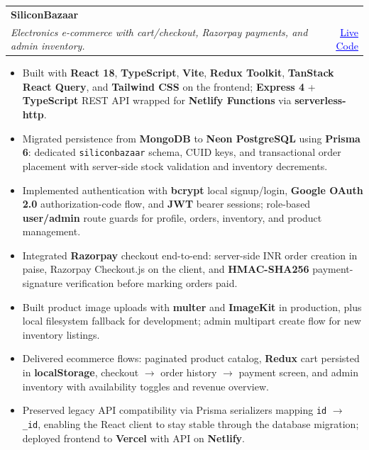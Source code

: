 \documentclass[a4paper,11pt]{article}
\makeatletter
\newcommand{\resumeProjectHeading}[4]{
\vspace{0.5mm}
    \item[]
    \begin{tabular*}{0.98\textwidth}[t]{l@{\extracolsep{\fill}}r}
        \textbf{#1} & \textit{\footnotesize{#2}} \\
        \textit{\footnotesize{#3}} & \footnotesize{#4}
    \end{tabular*}
    \vspace{-2.4mm}
}
\newcommand{\resumeProjectLinks}[2]{
    \footnotesize{
        \href{#1}{\textcolor{blue}{\underline{\faExternalLink*{} Live}}} \hspace{1mm}
        \href{#2}{\textcolor{blue}{\underline{\faCode{} Code}}}
    }
}
\newcommand{\resumeItemListStart}{\begin{justify}\begin{itemize}[leftmargin=3ex, rightmargin=2ex, noitemsep,labelsep=1.2mm,itemsep=0mm]\small}
\newcommand{\resumeItemListEnd}{\end{itemize}\end{justify}\vspace{-2mm}}
\makeatother
\begin{document}
    \resumeProjectHeading
        {SiliconBazaar}{} 
        {Electronics e-commerce with cart/checkout, Razorpay payments, and admin inventory.}{
        \resumeProjectLinks{https://siliconbazaar.vercel.app/}{https://github.com/itsarraj/siliconbazaar}
        }
    \resumeItemListStart
        \item {Built with \textbf{React 18}, \textbf{TypeScript}, \textbf{Vite}, \textbf{Redux Toolkit}, \textbf{TanStack React Query}, and \textbf{Tailwind CSS} on the frontend; \textbf{Express 4} + \textbf{TypeScript} REST API wrapped for \textbf{Netlify Functions} via \textbf{serverless-http}.}
        \item {Migrated persistence from \textbf{MongoDB} to \textbf{Neon PostgreSQL} using \textbf{Prisma 6}: dedicated \texttt{siliconbazaar} schema, CUID keys, and transactional order placement with server-side stock validation and inventory decrements.}
        \item {Implemented authentication with \textbf{bcrypt} local signup/login, \textbf{Google OAuth 2.0} authorization-code flow, and \textbf{JWT} bearer sessions; role-based \textbf{user/admin} route guards for profile, orders, inventory, and product management.}
        \item {Integrated \textbf{Razorpay} checkout end-to-end: server-side INR order creation in paise, Razorpay Checkout.js on the client, and \textbf{HMAC-SHA256} payment-signature verification before marking orders paid.}
        \item {Built product image uploads with \textbf{multer} and \textbf{ImageKit} in production, plus local filesystem fallback for development; admin multipart create flow for new inventory listings.}
        \item {Delivered ecommerce flows: paginated product catalog, \textbf{Redux} cart persisted in \textbf{localStorage}, checkout $\rightarrow$ order history $\rightarrow$ payment screen, and admin inventory with availability toggles and revenue overview.}
        \item {Preserved legacy API compatibility via Prisma serializers mapping \texttt{id} $\rightarrow$ \texttt{\_id}, enabling the React client to stay stable through the database migration; deployed frontend to \textbf{Vercel} with API on \textbf{Netlify}.}
    \resumeItemListEnd
    \vspace{-2mm}
\end{document}
